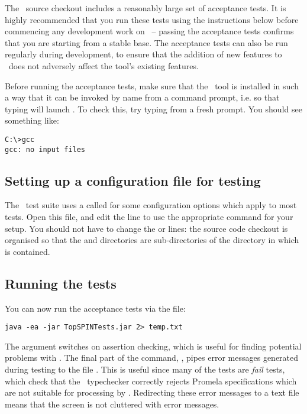 The \topspin\ source checkout includes a reasonably large set of
acceptance tests.  It is highly recommended that you run these
tests using the instructions below before commencing any development
work on \topspin\ -- passing the acceptance tests confirms that
you are starting from a stable base.  The acceptance tests can
also be run regularly during development, to ensure that the
addition of new features to \topspin\ does not adversely affect
the tool's existing features.

\vspace{2mm}
 Before running the acceptance tests, make sure that
the \gcc\ tool is installed in such a way that it can be invoked by
name from a command prompt, i.e. so that typing  will
launch \gcc. To check this, try typing  from a fresh
prompt.  You should see something like:
\vspace{2mm}
%
\begin{lstlisting}
C:\>gcc
gcc: no input files
\end{lstlisting}

\subsection{Setting up a configuration file for testing}

The \topspin\ test suite uses a called 
for some configuration options which apply to most tests.  Open
this file, and edit the  line to use the appropriate command
for your setup.  You should not have to change the  or
 lines: the source code checkout is organised so that the
 and  directories are sub-directories of
the directory in which  is
contained.

\subsection{Running the tests}

You can now run the acceptance
tests via the  file:
%
\begin{lstlisting}
java -ea -jar TopSPINTests.jar 2> temp.txt
\end{lstlisting}
%
The  argument switches on assertion checking, which is useful for
finding potential problems with \topspin.  The final part of the command,
, pipes error messages generated during testing to the
file .  This is useful since many of the tests are
\emph{fail} tests, which check that the \topspin\ typechecker correctly
rejects Promela specifications which are not suitable for processing by
\topspin.  Redirecting these error messages to a text file means that
the screen is not cluttered with error messages.

